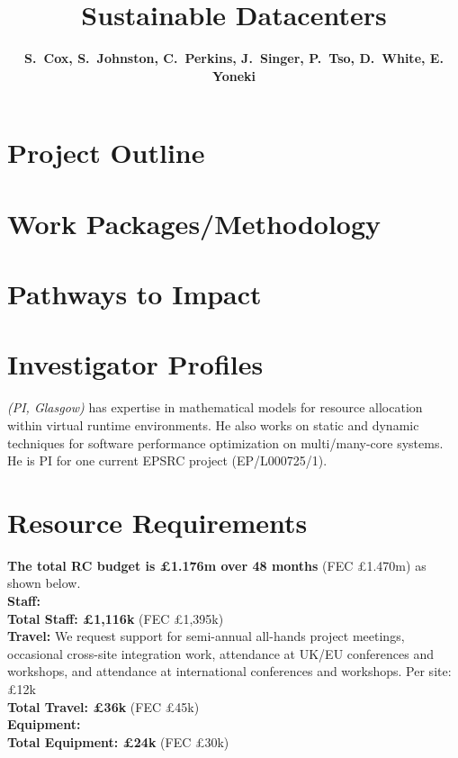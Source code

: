 \documentclass[a4paper,11pt]{article}
\begin{document}
\title{\Large \bfseries Sustainable Datacenters \vspace{-4mm}}
\author{\vspace{-5mm} \textbf{\normalsize S.\ Cox, S.\ Johnston, C.\ Perkins, J.\ Singer,  P.\ Tso, D.\ White, E. Yoneki}}
\date{\vspace{-6mm}}
\maketitle
\vspace{-5mm}
%
%
\section{Project Outline}



\section{Work Packages/Methodology}


\section{Pathways to Impact}



\section{Investigator Profiles}

\textit{(PI, Glasgow)} has 
expertise in mathematical models for resource allocation
within virtual runtime environments. He also works on
static and dynamic techniques for
software performance optimization on multi/many-core systems.
He is PI for one current EPSRC project (EP/L000725/1).



\section{Resource Requirements}

\textbf{The total RC budget is \pounds 1.176m over 48 months} (FEC \pounds 1.470m) as shown below.
\\
\textbf{Staff:} 
\\
\textbf{Total Staff: \pounds 1,116k} (FEC \pounds 1,395k)\vspace{1mm}
\\
\textbf{Travel:}
We request support for semi-annual all-hands project meetings,
occasional cross-site integration work,
attendance at UK/EU conferences and
workshops,
and attendance at international
conferences and workshops.
Per site: \pounds 12k
\\
\textbf{Total Travel: \pounds 36k} (FEC \pounds 45k)\vspace{1mm}
\\
\textbf{Equipment:}
\\
\textbf{Total Equipment: \pounds 24k} (FEC \pounds 30k)
\\



\end{document}
